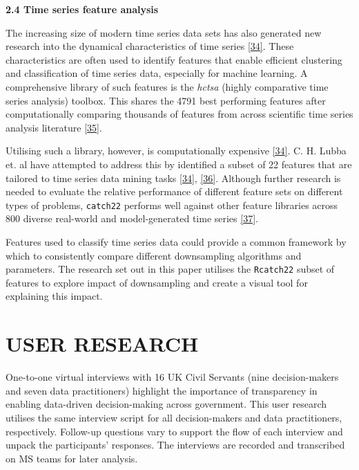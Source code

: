 \documentclass{article}
\begin{document}
\textbf{2.4 Time series feature analysis}

The increasing size of modern time series data sets has also generated
new research into the dynamical characteristics of time series
\protect\hyperlink{ref-catch22}{{[}34{]}}. These characteristics are
often used to identify features that enable efficient clustering and
classification of time series data, especially for machine learning. A
comprehensive library of such features is the \emph{hctsa} (highly
comparative time series analysis) toolbox. This shares the 4791 best
performing features after computationally comparing thousands of
features from across scientific time series analysis literature
\protect\hyperlink{ref-fulcher2017}{{[}35{]}}.

Utilising such a library, however, is computationally expensive
\protect\hyperlink{ref-catch22}{{[}34{]}}. C. H. Lubba et. al have
attempted to address this by identified a subset of 22 features that are
tailored to time series data mining tasks
\protect\hyperlink{ref-catch22}{{[}34{]}},
\protect\hyperlink{ref-bagnall}{{[}36{]}}. Although further research is
needed to evaluate the relative performance of different feature sets on
different types of problems, \texttt{catch22} performs well against
other feature libraries across 800 diverse real-world and
model-generated time series \protect\hyperlink{ref-henderson}{{[}37{]}}.

Features used to classify time series data could provide a common
framework by which to consistently compare different downsampling
algorithms and parameters. The research set out in this paper utilises
the \texttt{Rcatch22} subset of features to explore impact of
downsampling and create a visual tool for explaining this impact.

\hypertarget{user-research}{%
\section{USER RESEARCH}\label{user-research}}

One-to-one virtual interviews with 16 UK Civil Servants (nine
decision-makers and seven data practitioners) highlight the importance
of transparency in enabling data-driven decision-making across
government. This user research utilises the same interview script for
all decision-makers and data practitioners, respectively. Follow-up
questions vary to support the flow of each interview and unpack the
participants' responses. The interviews are recorded and transcribed on
MS teams for later analysis.
\end{document}
